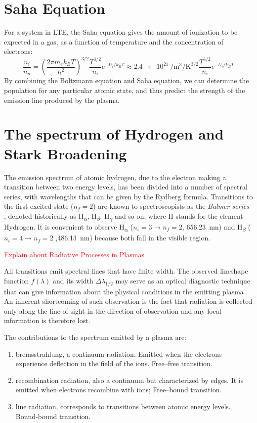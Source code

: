 \documentclass[justified,nofonts,nobib,openany]{tufte-book}
\begin{document}
\section{Saha Equation}\label{sec:saha}
For a system in LTE, the Saha equation gives the amount of ionization to be expected in a gas, as a function of temperature and the concentration of electrons:
\begin{equation}
		\frac{n_i}{n_n}= \left(\frac{2 \pi m_e k_B T}{h^2}\right)^{3/2}\frac{T^{3/2}}{n_i}e^{-U_i/k_B T} \approx \SI{2.4e21}{\per \metre\cubed \per\kelvin\tothe{3/2}} \frac{T^{3/2}}{n_i}e^{-U_i/k_B T}
\end{equation}
By combining the Boltzmann equation and Saha equation, we can determine the population for any particular atomic state, and thus predict the strength of the emission line produced by the plasma.

\section{The spectrum of Hydrogen and Stark Broadening}\label{sec:hydrogen}
The emission spectrum of atomic hydrogen, due to the electron making a transition between two energy levels, has been divided into a number of spectral series, with wavelengths that can be given by the Rydberg formula. Transitions to the first excited state ($n_f=2$) are known to spectroscopists as the \textit{Balmer series} , denoted historically as H\textsubscript{$\alpha$}, H\textsubscript{$\beta$}, H\textsubscript{$\gamma$} and so on, where H stands for the element Hydrogen. It is convenient to observe H\textsubscript{$\alpha$} ($n_i=3 \to n_f=2$, \SI{656.23}{\nm}) and H\textsubscript{$\beta$} ($n_i=4 \to n_f=2$ ,\SI{486.13}{\nm}) because both fall in the visible region.

\textcolor{red}{Explain about Radiative Processes in Plasmas}

All transitions emit spectral lines that have finite width. The observed lineshape function $f(\lambda)$ and its width $\Delta \lambda_{1/2}$ may serve as an optical diagnostic technique that can give information about the physical conditions in the emitting plasma \cite{Thorne1988Spectrophysics}. An inherent shortcoming of such observation is the fact that radiation is collected only along the line of sight in the direction of observation and any local information is therefore lost.

The contributions to the spectrum emitted by a plasma are:
\begin{enumerate}
    \item bremsstrahlung, a continuum radiation. Emitted when
    the electrons experience deflection in the field of the ions. Free--free transition.
    \item recombination radiation, also a continuum but characterized by edges. It is emitted when electrons recombine with ions; Free--bound transition.
    \item line radiation, corresponds to transitions between atomic energy levels. Bound-bound transition.
\end{enumerate}
\end{document}
